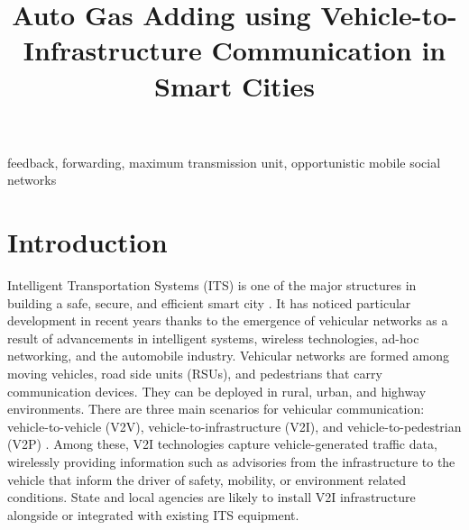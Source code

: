 \documentclass[conference]{IEEEtran}
\theoremstyle{definition}
\begin{document}
\title{Auto Gas Adding using Vehicle-to-Infrastructure Communication in Smart Cities }

\author{
}
\maketitle

\begin{abstract}

\end{abstract}

\begin{IEEEkeywords} feedback, forwarding, maximum transmission unit, opportunistic mobile social networks  \end{IEEEkeywords}


\vspace{-0.3cm}
\section{Introduction}
Intelligent Transportation Systems (ITS) \cite{Alam2016} is one of the major structures in building a safe, secure, and efficient smart city \cite{Bowerman2000}. It has noticed particular development in recent years thanks to the emergence of vehicular networks as a result of advancements in intelligent systems, wireless technologies, ad-hoc networking, and the automobile industry. Vehicular networks are formed among moving vehicles, road side units (RSUs), and pedestrians that carry communication devices. They can be deployed in rural, urban, and highway environments.  There are three main scenarios for vehicular communication: vehicle-to-vehicle (V2V), vehicle-to-infrastructure (V2I), and vehicle-to-pedestrian (V2P) \cite{Tseng2015}. Among these, V2I technologies capture vehicle-generated traffic data, wirelessly providing information such as advisories from the infrastructure to the vehicle that inform the driver of safety, mobility, or environment related conditions. State and local agencies are likely to install V2I infrastructure alongside or integrated with existing ITS equipment.
\end{document}

